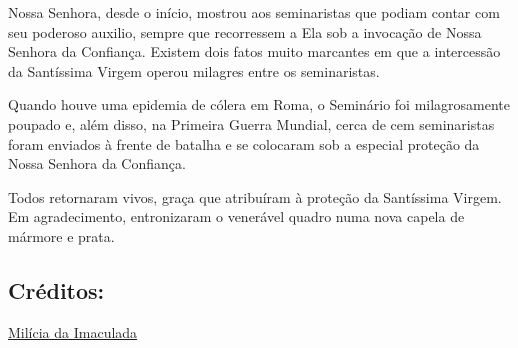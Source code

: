 \documentclass[18pt]{article}
\begin{document}
\begin{justify}
\begin{justify}
Nossa Senhora, desde o início, mostrou aos seminaristas que podiam contar com seu poderoso auxilio, sempre que recorressem a Ela sob a invocação de Nossa Senhora da Confiança. Existem dois fatos muito marcantes em que a intercessão da Santíssima Virgem operou milagres entre os seminaristas.

Quando houve uma epidemia de cólera em Roma, o Seminário foi milagrosamente poupado e, além disso, na Primeira Guerra Mundial, cerca de cem seminaristas foram enviados à frente de batalha e se colocaram sob a especial proteção da Nossa Senhora da Confiança.

Todos retornaram vivos, graça que atribuíram à proteção da Santíssima Virgem. Em agradecimento, entronizaram o venerável quadro numa nova capela de mármore e prata.
\end{justify}


\begin{center}
 \subsection*{Créditos:}
\href{https://www.miliciadaimaculada.org.br/colaborador/campanha/historia-de-nossa-senhora-da-confianca}{Milícia da Imaculada}
\end{center}


\end{justify}
\end{document}
